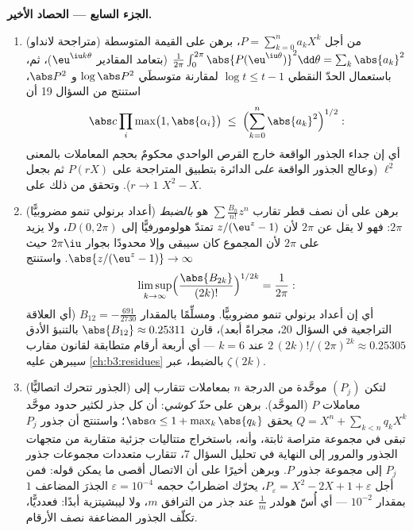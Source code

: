 \begin{problem}
\medskip
\noindent\textbf{الجزء السابع --- الحصاد الأخير.}
\begin{enumerate}[resume]
  \item (متراجحة لانداو) من أجل $P = \sum_{k=0}^na_kX^k$، برهن على القيمة
        المتوسطة $\frac1{2\pi}\int_0^{2\pi}
        \abs{P(\eu^{\iu\theta})}^2\dd\theta =
        \sum_k\abs{a_k}^2$ (بتعامد المقادير $\eu^{\iu k\theta}$)، ثم،
        باستعمال الحدّ النقطي $\log t \leq t - 1$ لمقارنة متوسطَي
        $\log\abs P^2$ و $\abs P^2$، استنتج من السؤال 19 أن
        \[
        \abs c\prod_{i}\max\bigl(1, \abs{\alpha_i}\bigr)
        \;\leq\;
        \Bigl(\sum_{k=0}^{n}\abs{a_k}^2\Bigr)^{1/2} :
        \]
        أي إن جداء الجذور الواقعة خارج القرص الواحدي محكومٌ
        بحجم المعاملات بالمعنى $\ell^2$ (وعالج الجذور الواقعة
        \emph{على} الدائرة بتطبيق المتراجحة على $P(rX)$ ثم
        بجعل $r \to 1$). وتحقق من ذلك على $X^2 - X$.
  \item (أعداد برنولي تنمو مضروبيًّا) برهن على أن نصف قطر تقارب
        $\sum\frac{B_n}{n!}z^n$ هو \emph{بالضبط} $2\pi$: فهو لا يقل عن $2\pi$ لأن
        $z/(\eu^z - 1)$ تمتدّ هولومورفيًّا إلى $D(0, 2\pi)$،
        ولا يزيد على $2\pi$ لأن المجموع كان سيبقى وإلا محدودًا
        بجوار $2\pi\iu$ حيث $\abs{z/(\eu^z-1)} \to \infty$. واستنتج
        \[
        \limsup_{k\to\infty}
        \Bigl(\frac{\abs{B_{2k}}}{(2k)!}\Bigr)^{1/2k}
        = \frac1{2\pi} :
        \]
        أي إن أعداد برنولي تنمو مضروبيًّا. ومسلِّمًا بالمقدار
        $B_{12}
        = -\frac{691}{2730}$ (أي العلاقة التراجعية في السؤال 20، مجراةً
        أبعد)، قارن $\abs{B_{12}} \approx 0.25311$ بالتنبؤ الأدق $2\,(2k)!/(2\pi)^{2k}
        \approx 0.25305$ عند $k = 6$
        --- أي أربعة أرقام متطابقة لقانون مقارب سيبرهن عليه
        \cref{ch:b3:residues} بالضبط، عبر $\zeta(2k)$.
  \item (الجذور تتحرك اتصاليًّا) لتكن $(P_j)$ موحَّدة من الدرجة
        $n$ بمعاملات تتقارب إلى معاملات $P$ (الموحَّد). برهن
        على \emph{حدّ كوشي}: أن كل جذر لكثير حدود موحَّد
        $Q = X^n + \sum_{k<n}q_kX^k$ يحقق $\abs\alpha \leq 1 + \max_k\abs{q_k}$؛ واستنتج أن جذور $P_j$ تبقى في
        مجموعة متراصة ثابتة، وأنه، باستخراج متتاليات جزئية
        متقاربة من متجهات الجذور والمرور إلى النهاية في تحليل
        السؤال 7، تتقارب متعددات مجموعات جذور $P_j$ إلى مجموعة
        جذور $P$. وبرهن أخيرًا على أن الاتصال أقصى ما يمكن
        قوله: فمن أجل $P_\varepsilon = X^2 - 2X + 1 +
        \varepsilon$، يحرّك اضطرابٌ حجمه $\varepsilon =
        10^{-4}$
        الجذرَ المضاعف $1$ بمقدار $10^{-2}$ --- أي أُسّ هولدر
        $\frac1m$ عند جذر من الترافق $m$، ولا ليبشيتزية أبدًا:
        فعدديًّا، تكلّف الجذور المضاعفة نصف الأرقام.
\end{enumerate}
\end{problem}
